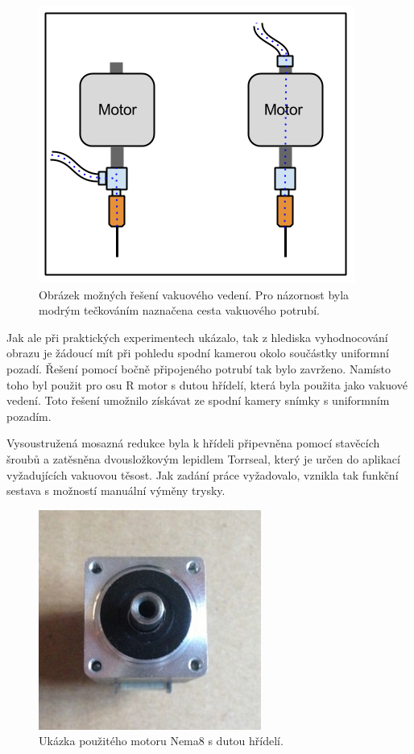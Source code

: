\begin{figure}[h!]
  \centering
    \includegraphics[width=0.6\linewidth]{obrazky/motorR.png}%
    \caption{Obrázek možných řešení vakuového vedení. Pro názornost byla modrým tečkováním naznačena cesta vakuového potrubí.}
    \label{fig:sensor}
\end{figure}

Jak ale při praktických experimentech ukázalo, tak z hlediska vyhodnocování obrazu je žádoucí mít při pohledu spodní kamerou okolo součástky uniformní pozadí. Řešení pomocí bočně připojeného potrubí tak bylo zavrženo. 
Namísto toho byl použit pro osu R motor s dutou hřídelí, která byla použita jako vakuové vedení. Toto řešení umožnilo získávat ze spodní kamery snímky s uniformním pozadím. 

Vysoustružená mosazná redukce byla k hřídeli připevněna pomocí stavěcích šroubů a zatěsněna dvousložkovým lepidlem Torrseal, který je určen do aplikací vyžadujících vakuovou těsost.
Jak zadání práce vyžadovalo, vznikla tak funkční sestava s možností manuální výměny trysky.

\begin{figure}[h!]
  \centering
    \includegraphics[width=0.6\linewidth]{obrazky/robotdigg_nema8.jpg}%
    \caption{Ukázka použitého motoru Nema8 s dutou hřídelí.}
    \label{fig:nema8}
\end{figure}

